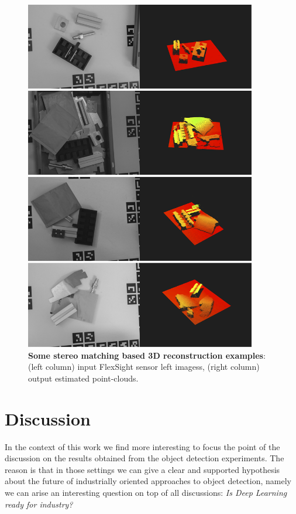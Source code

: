 \begin{figure}
    \centering
    \includegraphics[width=0.9\textwidth]{figures/4_experiments/3d_reconst_ex}
    \caption{\textbf{Some stereo matching based 3D reconstruction examples}: (left column) input FlexSight sensor left imagess, (right column) output estimated point-clouds.}
    \label{fig:3d_reconst_ex}
\end{figure}

\section{Discussion}\label{sec:exp_discussion}
In the context of this work we find more interesting to focus the point of the discussion on the results obtained from the object detection experiments. The reason is that in those settings we can give a clear and supported hypothesis about the future of industrially oriented approaches to object detection, namely we can arise an interesting question on top of all discussions: \emph{Is Deep Learning ready for industry?}

